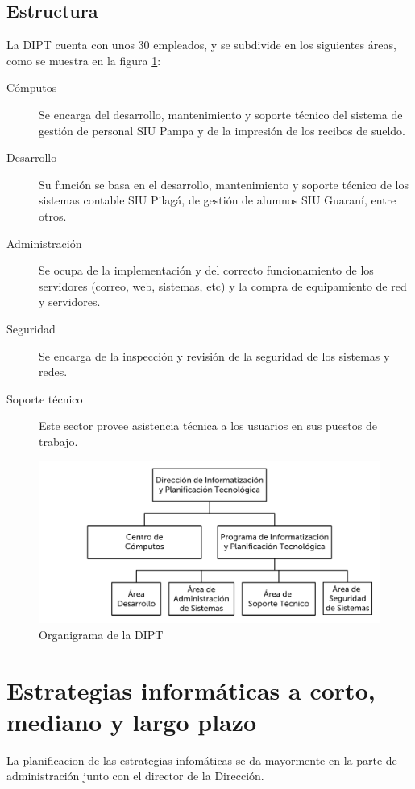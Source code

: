 \documentclass[a4paper,11pt,oneside]{article}
\begin{document}
\subsection{Estructura}
%
La DIPT cuenta con unos 30 empleados, y se subdivide en los siguientes
áreas, como se muestra en la figura \ref{organi-dipt}:
\begin{description}
\item[Cómputos]
  Se encarga del desarrollo, mantenimiento y soporte técnico del
  sistema de gestión de personal SIU Pampa y de la impresión de los
  recibos de sueldo.
%
\item[Desarrollo]
  Su función se basa en el desarrollo, mantenimiento y soporte técnico
  de los sistemas contable SIU Pilagá, de gestión de alumnos SIU
  Guaraní, entre otros.
%
\item[Administración]
  Se ocupa de la implementación y del correcto funcionamiento de los
  servidores (correo, web, sistemas, etc) y la compra de equipamiento
  de red y servidores.
%
\item[Seguridad]
  Se encarga de la inspección y revisión de la seguridad de los
  sistemas y redes.
%
\item[Soporte técnico]
  Este sector provee asistencia técnica a los usuarios en sus puestos
  de trabajo.
\end{description}
%
\begin{figure}
  \center\includegraphics[width=127mm]{img/organi_dipt}
  \caption{Organigrama de la DIPT}
  \label{organi-dipt}
\end{figure}
%
\section{Estrategias informáticas a corto, mediano y largo plazo}
%
La planificacion de las estrategias infomáticas se da mayormente en la
parte de administración junto con el director de la Dirección.
\end{document}
